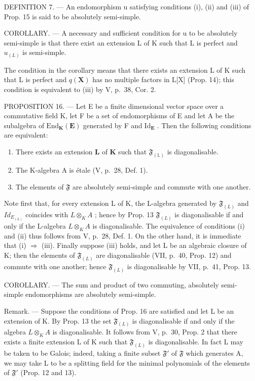 DEFINITION 7. --- An endomorphism u satisfying conditions (i), (ii) and (iii) of Prop. 15 is said to be absolutely semi-simple.

COROLLARY. --- A necessary and sufficient condition for u to be absolutely semi-simple is that there exist an extension L of K such that L is perfect and \(u_{(L)}\) is semi-simple.

The condition in the corollary means that there exists an extension L of K such that L is perfect and \(q(\mathbf{X})\) has no multiple factors in L{[}X{]} (Prop. 14); this condition is equivalent to (iii) by V, p.~38, Cor. 2.

PROPOSITION 16. --- Let E be a finite dimensional vector space over a commutative field K, let F be a set of endomorphisms of E and let A be the subalgebra of \(\mathrm{End}_{\mathbf{K}}(\mathbf{E})\) generated by F and \(\mathrm{Id}_{\mathbf{E}}\) . Then the following conditions are equivalent:

\begin{enumerate}
\def\labelenumi{(\roman{enumi})}
\item
  There exists an extension \(\mathbf{L}\) of \(\mathbf{K}\) such that \(\mathfrak{F}_{(\mathbb{L})}\) is diagonalisable.
\item
  The K-algebra A is étale (V, p.~28, Def. 1).
\item
  The elements of \(\mathfrak{F}\) are absolutely semi-simple and commute with one another.
\end{enumerate}

Note first that, for every extension L of K, the L-algebra generated by \(\mathfrak{F}_{(L)}\) and \(Id_{E_{(L)}}\) coincides with \(L \otimes_{K} A\) ; hence by Prop. 13 \(\mathfrak{F}_{(L)}\) is diagonalisable if and only if the L-algebra \(L \otimes_{K} A\) is diagonalisable. The equivalence of conditions (i) and (ii) thus follows from V, p.~28, Def. 1. On the other hand, it is immediate that (i) \(\Rightarrow\) (iii). Finally suppose (iii) holds, and let L be an algebraic closure of K; then the elements of \(\mathfrak{F}_{(L)}\) are diagonalisable (VII, p.~40, Prop. 12) and commute with one another; hence \(\mathfrak{F}_{(L)}\) is diagonalisable by VII, p.~41, Prop. 13.

COROLLARY. --- The sum and product of two commuting, absolutely semi-simple endomorphisms are absolutely semi-simple.

Remark. --- Suppose the conditions of Prop. 16 are satisfied and let L be an extension of K. By Prop. 13 the set \(\mathfrak{F}_{(L)}\) is diagonalisable if and only if the algebra \(L \otimes_K A\) is diagonalisable. It follows from V, p.~30, Prop. 2 that there exists a finite extension L of K such that \(\mathfrak{F}_{(L)}\) is diagonalisable. In fact L may be taken to be Galois; indeed, taking a finite subset \(\mathfrak{F}'\) of \(\mathfrak{F}\) which generates A, we may take L to be a splitting field for the minimal polynomials of the elements of \(\mathfrak{F}'\) (Prop. 12 and 13).


